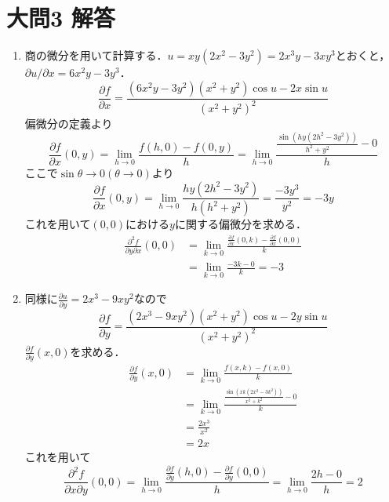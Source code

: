 \documentclass[dvipdfmx]{jsreport}
\begin{document}
\section{大問3 解答}
\begin{souanswer} %
\begin{enumerate}
	\item 商の微分を用いて計算する．$u= xy(2x^2- 3y^2)= 2x^3y- 3xy^3$とおくと，$\partial u/\partial x= 6x^2y- 3y^3$．
\begin{equation*}
	\frac{\partial f}{\partial x}= \frac{(6x^2y- 3y^2)(x^2+ y^2)\cos{u}- 2x\sin{u}}{(x^2+ y^2)^2}
\end{equation*}
	偏微分の定義より
\begin{equation*}
	\frac{\partial f}{\partial x}(0, y)= \lim_{h\to 0} \frac{f(h, 0)- f(0, y)}{h}= \lim_{h\to 0} \frac{\frac{\sin{(hy(2h^2- 3y^2))}}{h^2+ y^2}- 0}{h}
\end{equation*}
	ここで$\sin{\theta}\to 0(\theta\to 0)$より
\begin{equation*}
	\frac{\partial f}{\partial x}(0, y)= \lim_{h\to 0} \frac{hy(2h^2- 3y^2)}{h(h^2+ y^2)}= \frac{-3y^3}{y^2}= -3y
\end{equation*}
	これを用いて$(0, 0)$における$y$に関する偏微分を求める．
\begin{align*}
	\frac{\partial^2 f}{\partial y\partial x}(0, 0)
	&= \lim_{k\to 0} \frac{\frac{\partial f}{\partial x}(0, k)- \frac{\partial f}{\partial x}(0, 0)}{k}\\
	&=\lim_{k\to 0} \frac{-3k- 0}{k}= -3
\end{align*}

	\item 同様に$\frac{\partial u}{\partial y}= 2x^3-9xy^2$なので
\begin{equation*}
	\frac{\partial f}{\partial y}= \frac{(2x^3- 9xy^2)(x^2+ y^2)\cos{u}- 2y\sin{u}}{(x^2+ y^2)^2}
\end{equation*}
	$\frac{\partial f}{\partial y}(x, 0)$を求める．
\begin{align*}
	\frac{\partial f}{\partial y}(x, 0)
	&= \lim_{k\to 0} \frac{f(x, k)- f(x, 0)}{k}\\
	&= \lim_{k\to 0} \frac{\frac{\sin(xk(2x^2- 3k^2))}{x^2+ k^2}- 0}{k}\\
	&= \frac{2x^3}{x^2}\\
	&= 2x
\end{align*}
	これを用いて
\begin{equation*}
	\frac{\partial^2 f}{\partial x\partial y}(0, 0)= \lim_{h\to 0} \frac{\frac{\partial f}{\partial y}(h, 0)- \frac{\partial f}{\partial y}(0, 0)}{h}= \lim_{h\to 0} \frac{2h- 0}{h}= 2
\end{equation*}


\end{enumerate}
\end{souanswer}
\end{document}
